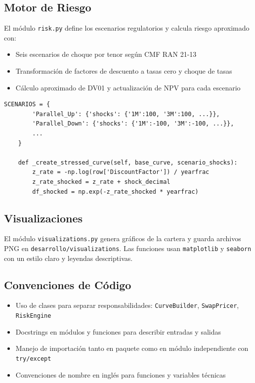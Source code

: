 \subsection*{Motor de Riesgo}
El módulo \texttt{risk.py} define los escenarios regulatorios y calcula riesgo aproximado con:
\begin{itemize}
    \item Seis escenarios de choque por tenor según CMF RAN 21-13
    \item Transformación de factores de descuento a tasas cero y choque de tasas
    \item Cálculo aproximado de DV01 y actualización de NPV para cada escenario
\end{itemize}

\begin{lstlisting}[caption={Extracción de \texttt{risk.py}}]
    SCENARIOS = {
        'Parallel_Up': {'shocks': {'1M':100, '3M':100, ...}},
        'Parallel_Down': {'shocks': {'1M':-100, '3M':-100, ...}},
        ...
    }

    def _create_stressed_curve(self, base_curve, scenario_shocks):
        z_rate = -np.log(row['DiscountFactor']) / yearfrac
        z_rate_shocked = z_rate + shock_decimal
        df_shocked = np.exp(-z_rate_shocked * yearfrac)
\end{lstlisting}

\subsection*{Visualizaciones}
El módulo \texttt{visualizations.py} genera gráficos de la cartera y guarda archivos PNG en \texttt{desarrollo/visualizations}. Las funciones usan \texttt{matplotlib} y \texttt{seaborn} con un estilo claro y leyendas descriptivas.

\subsection*{Convenciones de Código}
\begin{itemize}
    \item Uso de clases para separar responsabilidades: \texttt{CurveBuilder}, \texttt{SwapPricer}, \texttt{RiskEngine}
    \item Docstrings en módulos y funciones para describir entradas y salidas
    \item Manejo de importación tanto en paquete como en módulo independiente con \texttt{try/except}
    \item Convenciones de nombre en inglés para funciones y variables técnicas
\end{itemize}


